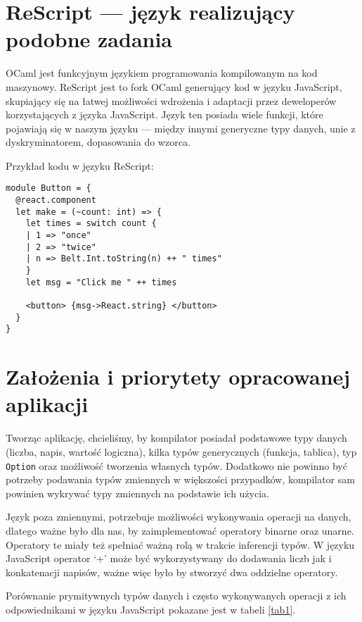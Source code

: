 \documentclass[a4paper,12pt]{book} %
\begin{document}
\chapter{ReScript --- język realizujący podobne zadania}
OCaml jest funkcyjnym językiem programowania kompilowanym na kod maszynowy.
ReScript jest to fork OCaml generujący kod w języku JavaScript, skupiający się na łatwej możliwości wdrożenia i adaptacji przez deweloperów korzystających z języka JavaScript.
Język ten posiada wiele funkcji, które pojawiają się w naszym języku --- między innymi generyczne typy danych, unie z dyskryminatorem, dopasowania do wzorca.

Przykład kodu w języku ReScript:
\begin{lstlisting}
module Button = {
  @react.component
  let make = (~count: int) => {
    let times = switch count {
    | 1 => "once"
    | 2 => "twice"
    | n => Belt.Int.toString(n) ++ " times"
    }
    let msg = "Click me " ++ times

    <button> {msg->React.string} </button>
  }
}
\end{lstlisting}
\chapter{Założenia i priorytety opracowanej aplikacji}
Tworząc aplikację, chcieliśmy, by kompilator posiadał podstawowe typy danych (liczba, napis, wartość logiczna), kilka typów generycznych (funkcja, tablica), typ \lstinline$Option$ oraz możliwość tworzenia własnych typów.
Dodatkowo nie powinno być potrzeby podawania typów zmiennych w większości przypadków, kompilator sam powinien wykrywać typy zmiennych na podstawie ich użycia.


Język poza zmiennymi, potrzebuje możliwości wykonywania operacji na danych, dlatego ważne było dla nas, by zaimplementować operatory binarne oraz unarne. Operatory te miały też spełniać ważną rolą w trakcie inferencji typów. W języku JavaScript operator `+' może być wykorzystywany do dodawania liczb jak i konkatenacji napisów, ważne więc było by stworzyć dwa oddzielne operatory.



Porównanie prymitywnych typów danych i często wykonywanych operacji z ich odpowiednikami w języku JavaScript pokazane jest w tabeli \ref{tab1}.
\end{document}
